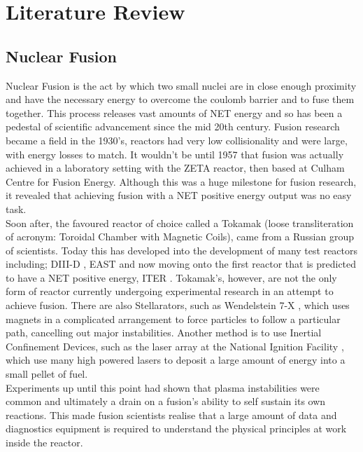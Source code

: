 \documentclass[12pt,a4paper,oneside]{report}
\begin{document}

\chapter{Literature Review}
	\section{Nuclear Fusion}
Nuclear Fusion is the act by which two small nuclei are in close enough proximity and have the necessary energy to overcome the coulomb barrier and to fuse them together. This process releases vast amounts of NET energy and so has been a pedestal of scientific advancement since the mid 20th century. Fusion research became a field in the 1930's, reactors had very low collisionality and were large, with energy losses to match. It wouldn't be until 1957 that fusion was actually achieved in a laboratory setting with the ZETA reactor, then based at Culham Centre for Fusion Energy. Although this was a huge milestone for fusion research, it revealed that achieving fusion with a NET positive energy output was no easy task. \\
Soon after, the favoured reactor of choice called a Tokamak (loose transliteration of acronym: Toroidal Chamber with Magnetic Coils), came from a Russian group of scientists. Today this has developed into the development of many test reactors including; DIII-D \cite{AymarOverviewExperiment} , EAST \cite{Gao2008DiagnosticsTokamak} and now moving onto the first reactor that is predicted to have a NET positive energy, ITER \cite{Litaudon2017OverviewITER}. Tokamak's, however, are not the only form of reactor currently undergoing experimental research in an attempt to achieve fusion. There are also Stellarators, such as Wendelstein 7-X \cite{Klinger2016Wendelstein7-X}, which uses magnets in a complicated arrangement to force particles to follow a particular path, cancelling out major instabilities. Another method is to use Inertial Confinement Devices, such as the laser array at the National Ignition Facility \cite{Lindl1995DevelopmentGain}, which use many high powered lasers to deposit a large amount of energy into a small pellet of fuel. 
\\
Experiments up until this point had shown that plasma instabilities were common and ultimately a drain on a fusion's ability to self sustain its own reactions. This made fusion scientists realise that a large amount of data and diagnostics equipment is required to understand the physical principles at work inside the reactor.
\pagebreak
\end{document}
